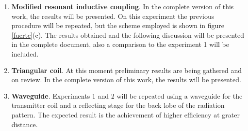 \documentclass{intech}
\begin{document}
{\begin{enumerate}
\begin{figure}[htbp]	%
\centering
{} %
\vspace{-0.3cm}
\caption{Generator coil radiation pattern.}
\label{datos1}
\end{figure}
\item  {\bf Modified resonant inductive coupling}. In the complete version of this work, the results will be presented.
On this experiment the previous procedure will be repeated, but the scheme employed is shown in figure \ref{fuerte}(c). The results obtained and the following discussion will be presented in the complete document, also a comparison to the experiment 1 will be included.
\item  {\bf Triangular coil}. At this moment preliminary results are being gathered and on review.  In the complete version of this work, the results will be presented.


\item {\bf Waveguide}. Experiments 1 and 2 will be repeated using a waveguide for the transmitter coil and a reflecting stage for the back lobe of the radiation pattern. The expected result is the achievement of higher efficiency at grater distance.
\end{enumerate}
}
\end{document}
